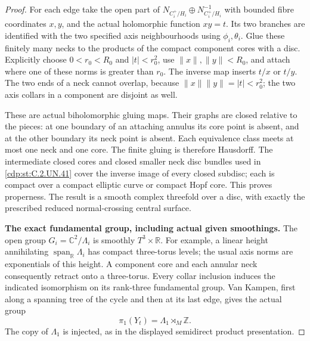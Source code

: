 \begin{proof}
For each edge take the open part of
$N_{C_i^+/H_i}\oplus N_{C_i^+/H_i}^{-1}$
with bounded fibre coordinates $x,y$, and the
actual holomorphic function $xy=t$.
Its two branches are identified with the two
specified axis neighbourhoods using $\phi_i,\theta_i$.
Glue these finitely many necks to the products
of the compact component cores with a disc.
Explicitly choose $0<r_0<R_0$ and $|t|<r_0^2$,
use $\|x\|,\|y\|<R_0$, and attach where one of
these norms is greater than $r_0$.
The inverse map inserts $t/x$ or $t/y$.
The two ends of a neck cannot overlap, because
$\|x\|\|y\|=|t|<r_0^2$; the two axis collars in
a component are disjoint as well.

These are actual biholomorphic gluing maps.
Their graphs are closed relative to the pieces:
at one boundary of an attaching annulus its core
point is absent, and at the other boundary its
neck point is absent. Each equivalence class
meets at most one neck and one core. The finite
gluing is therefore Hausdorff. The intermediate
closed cores and closed smaller neck disc bundles
used in \ref{cdp:st:C.2.UN.41} cover the inverse image of every
closed subdisc; each is compact over a compact
elliptic curve or compact Hopf core. This proves
properness. The result is a smooth complex
threefold over a disc, with exactly the prescribed
reduced normal-crossing central surface.

\par\medskip\noindent\textbf{The exact fundamental group, including actual given smoothings.}
The open group $G_i=\mathbb C^2/\Lambda_i$ is
smoothly $T^3\times\mathbb R$.
For example, a linear height annihilating
$\operatorname{span}_{\mathbb R}\Lambda_i$ has
compact three-torus levels; the usual axis norms
are exponentials of this height. A component
core and each annular neck consequently retract
onto a three-torus. Every collar inclusion
induces the indicated isomorphism on its
rank-three fundamental group. Van Kampen,
first along a spanning tree of the cycle and
then at its last edge, gives the actual group
\[
                       \pi_1(Y_t)=\Lambda_1\rtimes_M\mathbb Z.
\tag{C.HC.7}\label{cdp:eq:C.HC.7}
\]
The copy of $\Lambda_1$ is injected, as in the
displayed semidirect product presentation.


\end{proof}
